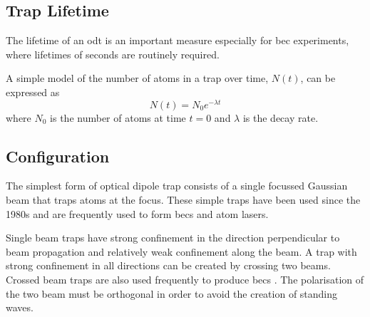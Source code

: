 \subsection{Trap Lifetime}
\label{lifetime_section}
The lifetime of an \gls{odt} is an important measure especially for \gls{bec} experiments, where lifetimes of seconds are routinely required\cite{cennini_bose-einstein_2003, kuppens_loading_2000, barrett_all-optical_2001}.

A simple model of the number of atoms in a trap over time, $N(t)$, can be expressed as
\begin{equation}
N(t) = N_0 e^{-\lambda t}
\end{equation}
where $N_0$ is the number of atoms at time $t=0$ and $\lambda$ is the decay rate.

\subsection{Configuration}

The simplest form of optical dipole trap consists of a single focussed Gaussian beam that traps atoms at the focus. These simple traps have been used since the 1980s\cite{chu_experimental_1986} and are frequently used to form \glspl{bec} and atom lasers\cite{chikkatur_continuous_2002, kleine_buning_slow_2010, lin_rapid_2009}.

Single beam traps have strong confinement in the direction perpendicular to beam propagation and relatively weak confinement along the beam. A trap with strong confinement in all directions can be created by crossing two beams. Crossed beam traps are also used frequently to produce \glspl{bec} \cite{couvert_quasi-monomode_2008, arnold_all-optical_2011, fu_bose-einstein_2011, barrett_all-optical_2001, xiong_evaporative_2010}. The polarisation of the two beam must be orthogonal in order to avoid the creation of standing waves.\label{odt_polarisation}

